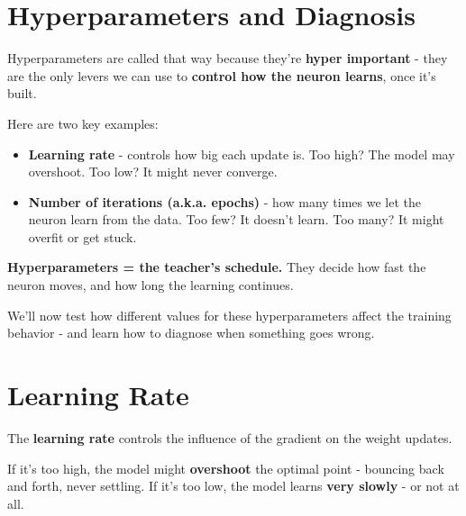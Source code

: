 \documentclass[11pt]{article}
\begin{document}
\section*{Hyperparameters and Diagnosis}

\vspace{0.5em}

Hyperparameters are called that way because they're \textbf{hyper important} -  
they are the only levers we can use to \textbf{control how the neuron learns}, once it's built.

\vspace{0.5em}

Here are two key examples:

\begin{itemize}
    \item \textbf{Learning rate} - controls how big each update is.  
    Too high? The model may overshoot. Too low? It might never converge.
    
    \item \textbf{Number of iterations (a.k.a. epochs)} - how many times we let the neuron learn from the data.  
    Too few? It doesn't learn. Too many? It might overfit or get stuck.
\end{itemize}

\vspace{1em}

\begin{tcolorbox}[colback=white!98!gray, colframe=gray!30!black, arc=1mm]
\textbf{Hyperparameters = the teacher's schedule.}  
They decide how fast the neuron moves, and how long the learning continues.
\end{tcolorbox}

\vspace{1em}

We'll now test how different values for these hyperparameters affect the training behavior -  
and learn how to diagnose when something goes wrong.

\section*{Learning Rate}

\vspace{0.5em}

The \textbf{learning rate} controls the influence of the gradient on the weight updates.

If it's too high, the model might \textbf{overshoot} the optimal point - bouncing back and forth, never settling.  
If it's too low, the model learns \textbf{very slowly} - or not at all.
\end{document}
